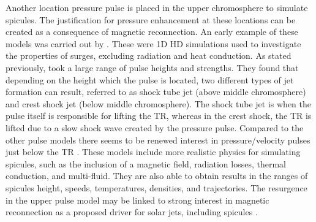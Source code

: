 Another location pressure pulse is placed in the upper chromosphere to simulate spicules. The justification for pressure enhancement at these locations can be created as a consequence of magnetic reconnection. An early example of these models was carried out by \cite{Shibata1982}. These were 1D HD simulations used to investigate the properties of surges, excluding radiation and heat conduction. As stated previously, \cite{Shibata1982} took a large range of pulse heights and strengths. They found that depending on the height which the pulse is located, two different types of jet formation can result, referred to as shock tube jet (above middle chromosphere) and crest shock jet (below middle chromosphere). The shock tube jet is when the pulse itself is responsible for lifting the TR, whereas in the crest shock, the TR is lifted due to a slow shock wave created by the pressure pulse. Compared to the other pulse models there seems to be renewed interest in pressure/velocity pulses just below the TR \citep{Murawski2010AA519A8M, Smirnova2016SoPh2913207S, Kuzma2017AA597A133K, kuzma2017ApJ84978K, Singh2019}. These models include more realistic physics for simulating spicules, such as the inclusion of a magnetic field, radiation losses, thermal conduction, and multi-fluid. They are also able to obtain results in the ranges of spicules height, speeds, temperatures, densities, and trajectories. The resurgence in the upper pulse model may be linked to strong interest in magnetic reconnection as a proposed driver for solar jets, including spicules \citep{Yokoyama1995Natur37542Y, Yokoyama1996PASJ48353Y, Pontieu2007PASJ, Gonz2017ApJ, Gonz2018ApJ856176G}.
